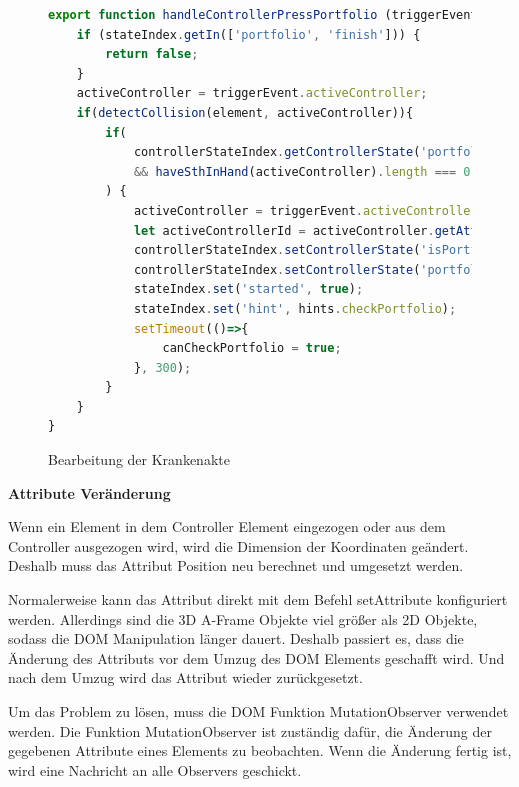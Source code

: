 \begin{figure}[ht]
\vspace*{1em}
\centering
\caption[Bearbeitung der Krankenakte]{Bearbeitung der Krankenakte}
\begin{lstlisting}[language=JavaScript, style=htmlcssjs]
export function handleControllerPressPortfolio (triggerEvent) {
    if (stateIndex.getIn(['portfolio', 'finish'])) {
        return false;
    }
    activeController = triggerEvent.activeController;
    if(detectCollision(element, activeController)){
        if(
            controllerStateIndex.getControllerState('portfolioInHand') === null
            && haveSthInHand(activeController).length === 0
        ) {
            activeController = triggerEvent.activeController;
            let activeControllerId = activeController.getAttribute('id');
            controllerStateIndex.setControllerState('isPortfolioHandling', true);
            controllerStateIndex.setControllerState('portfolioInHand', activeControllerId);
            stateIndex.set('started', true);
            stateIndex.set('hint', hints.checkPortfolio);
            setTimeout(()=>{
                canCheckPortfolio = true;
            }, 300);
        }
    }
}
\end{lstlisting}
\label{fig:portfolioPress} 
\end{figure}
  
  \vspace{1em}
  \noindent
  \textbf{Attribute Veränderung}
  \vspace{1em}
  
  \noindent
  Wenn ein Element in dem Controller Element eingezogen oder aus dem Controller ausgezogen wird, wird die Dimension der Koordinaten geändert. Deshalb muss das Attribut Position neu berechnet und umgesetzt werden.
  
  Normalerweise kann das Attribut direkt mit dem Befehl {\selectfont setAttribute} konfiguriert werden. Allerdings sind die 3D A-Frame Objekte viel größer als 2D Objekte, sodass die DOM Manipulation länger dauert. Deshalb passiert es, dass die Änderung des Attributs vor dem Umzug des DOM Elements geschafft wird. Und nach dem Umzug wird das Attribut wieder zurückgesetzt.
  
  Um das Problem zu lösen, muss die DOM Funktion {\selectfont MutationObserver} verwendet werden. Die Funktion {\selectfont MutationObserver} ist zuständig dafür, die Änderung der gegebenen Attribute eines Elements zu beobachten. Wenn die Änderung fertig ist, wird eine Nachricht an alle Observers geschickt.
  
